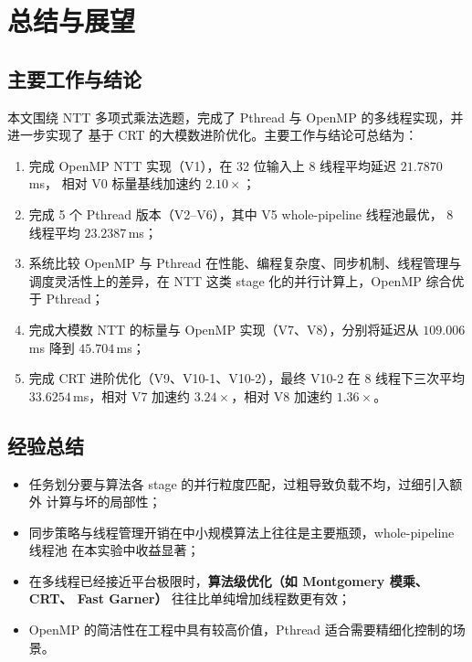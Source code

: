 \documentclass[UTF8,a4paper,10pt]{ctexart}
\begin{document}
\section{总结与展望}

\subsection{主要工作与结论}

本文围绕 NTT 多项式乘法选题，完成了 Pthread 与 OpenMP 的多线程实现，并进一步实现了
基于 CRT 的大模数进阶优化。主要工作与结论可总结为：

\begin{enumerate}
  \item 完成 OpenMP NTT 实现（V1），在 32 位输入上 8 线程平均延迟 $21.7870$\,ms，
        相对 V0 标量基线加速约 $2.10\times$；
  \item 完成 5 个 Pthread 版本（V2--V6），其中 V5 whole-pipeline 线程池最优，
        8 线程平均 $23.2387$\,ms；
  \item 系统比较 OpenMP 与 Pthread 在性能、编程复杂度、同步机制、线程管理与
        调度灵活性上的差异，在 NTT 这类 stage 化的并行计算上，OpenMP 综合优于 Pthread；
  \item 完成大模数 NTT 的标量与 OpenMP 实现（V7、V8），分别将延迟从 $109.006$\,ms
        降到 $45.704$\,ms；
  \item 完成 CRT 进阶优化（V9、V10-1、V10-2），最终 V10-2 在 8 线程下三次平均
        $33.6254$\,ms，相对 V7 加速约 $3.24\times$，相对 V8 加速约 $1.36\times$。
\end{enumerate}

\subsection{经验总结}

\begin{itemize}
  \item 任务划分要与算法各 stage 的并行粒度匹配，过粗导致负载不均，过细引入额外
        计算与坏的局部性；
  \item 同步策略与线程管理开销在中小规模算法上往往是主要瓶颈，whole-pipeline 线程池
        在本实验中收益显著；
  \item 在多线程已经接近平台极限时，\textbf{算法级优化（如 Montgomery 模乘、CRT、
        Fast Garner）} 往往比单纯增加线程数更有效；
  \item OpenMP 的简洁性在工程中具有较高价值，Pthread 适合需要精细化控制的场景。
\end{itemize}
\end{document}

